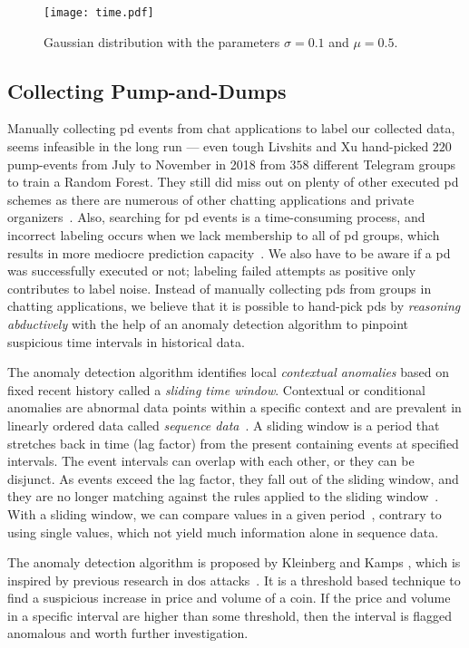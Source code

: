 \begin{figure}
    \centering
    \texttt{[image: time.pdf]}
    \caption[\project's time processing curve]{Gaussian distribution with the parameters $\sigma=0.1$ and $\mu=0.5$.}
    \label{fig:unixtime}
\end{figure}

\subsection{Collecting Pump-and-Dumps}
Manually collecting \ac{pd} events from chat applications to label our collected data, seems infeasible in the long run — even tough Livshits and Xu \cite{P&D_anatomy} hand-picked $220$ pump-events from July to November in 2018 from $358$ different Telegram groups to train a Random Forest. They still did miss out on plenty of other executed \ac{pd} schemes as there are numerous of other chatting applications and private organizers~\cite{blockonomi}. Also, searching for \ac{pd} events is a time-consuming process, and incorrect labeling occurs when we lack membership to all of \ac{pd} groups, which results in more mediocre prediction capacity~\cite{label_noise}. We also have to be aware if a \ac{pd} was successfully executed or not; labeling failed attempts as positive only contributes to label noise. Instead of manually collecting \acp{pd} from groups in chatting applications, we believe that it is possible to hand-pick \acp{pd} by \emph{reasoning abductively} with the help of an anomaly detection algorithm to pinpoint suspicious time intervals in historical data.

The anomaly detection algorithm identifies local \emph{contextual anomalies} based on fixed recent history called a \emph{sliding time window}. Contextual or conditional anomalies are abnormal data points within a specific context and are prevalent in linearly ordered data called \emph{sequence data}~\cite{anomaly_survey}. A sliding window is a period that stretches back in time (lag factor) from the present containing events at specified intervals. The event intervals can overlap with each other, or they can be disjunct. As events exceed the lag factor, they fall out of the sliding window, and they are no longer matching against the rules applied to the sliding window~\cite{redhat}. With a sliding window, we can compare values in a given period~\cite{P&D_to_the_moon}, contrary to using single values, which not yield much information alone in sequence data.

The anomaly detection algorithm is proposed by Kleinberg and Kamps \cite{P&D_to_the_moon}, which is inspired by previous research in \ac{dos} attacks~\cite{dos}. It is a threshold based technique to find a suspicious increase in price and volume of a coin. If the price and volume in a specific interval are higher than some threshold, then the interval is flagged anomalous and worth further investigation.

